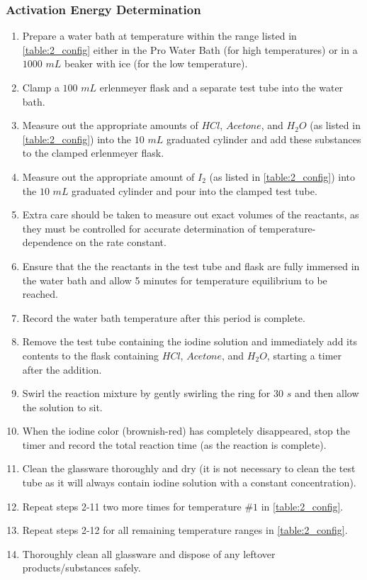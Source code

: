\subsubsection{Activation Energy Determination}
	\begin{enumerate}[itemsep=-1ex]
	  \item Prepare a water bath at temperature within the range listed in \cref{table:2_config} either in the Pro Water Bath (for high temperatures) or in a $1000$ $mL$ beaker with ice (for the low temperature).
	  \item Clamp a $100$ $mL$ erlenmeyer flask and a separate test tube into the water bath.
	  \item Measure out the appropriate amounts of $HCl$, $Acetone$, and $H_2O$ (as listed in \cref{table:2_config}) into the $10$ $mL$ graduated cylinder and add these substances to the clamped erlenmeyer flask.
	  \item Measure out the appropriate amount of $I_2$ (as listed in \cref{table:2_config}) into the $10$ $mL$ graduated cylinder and pour into the clamped test tube.
	  \item Extra care should be taken to measure out exact volumes of the reactants, as they must be controlled for accurate determination of temperature-dependence on the rate constant.
	  \item Ensure that the the reactants in the test tube and flask are fully immersed in the water bath and allow 5 minutes for temperature equilibrium to be reached.
	  \item Record the water bath temperature after this period is complete.
	  \item Remove the test tube containing the iodine solution and immediately add its contents to the flask containing $HCl$, $Acetone$, and $H_2O$, starting a timer after the addition.
	  \item Swirl the reaction mixture by gently swirling the ring for $30$ $s$ and then allow the solution to sit.
	  \item When the iodine color (brownish-red) has completely disappeared, stop the timer and record the total reaction time (as the reaction is complete).
	  \item Clean the glassware thoroughly and dry (it is not necessary to clean the test tube as it will always contain iodine solution with a constant concentration).
	  \item Repeat steps 2-11 two more times for temperature $\#1$ in \cref{table:2_config}.
	  \item Repeat steps 2-12 for all remaining temperature ranges in \cref{table:2_config}.
	  \item Thoroughly clean all glassware and dispose of any leftover products/substances safely.
	\end{enumerate}

